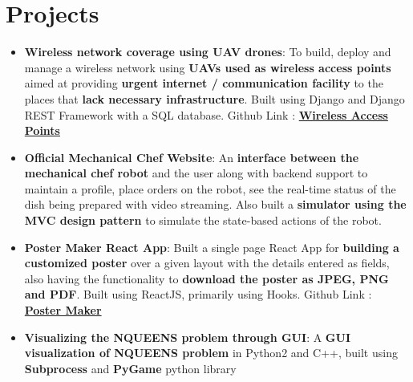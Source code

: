 \documentclass[a4paper,timesnewroman,11pt, twoside]{article}
\numberwithin{equation}{section}
\newcommand{\resumeItem}[2]{
  \item\small{
    \textbf{#1}{: #2 \vspace{-5pt}}
  }
}
\newcommand{\resumeSubItem}[2]{\resumeItem{#1}{#2}\vspace{-3pt}}
\newcommand{\resumeSubHeadingListStart}{\begin{itemize}[leftmargin=*]}
\newcommand{\resumeSubHeadingListEnd}{\end{itemize}}
\begin{document}
\section{Projects}
  \resumeSubHeadingListStart
    \resumeSubItem{Wireless network coverage using UAV drones}
    { To build, deploy and manage a wireless network using \textbf{UAVs used as wireless access points} aimed at providing \textbf{urgent internet / communication facility} to the places that \textbf{lack necessary infrastructure}. Built using Django and Django REST Framework with a SQL database. Github Link : \href{https://github.com/SaxenaKartik/MP2}{\textbf{Wireless Access Points}}
    }
    \resumeSubItem{Official Mechanical Chef Website}
      {An \textbf{interface between the mechanical chef robot} and the user along with backend support to maintain a profile, place orders on the robot, see the real-time status of the dish being prepared with video streaming. Also built a \textbf{simulator using the MVC design pattern} to simulate the state-based actions of the robot.}
    \resumeSubItem{Poster Maker React App}
      {Built a single page React App for \textbf{building a customized poster} over a given layout with the details entered as fields, also having the functionality to \textbf{download the poster as JPEG, PNG and PDF}. Built using ReactJS, primarily using Hooks. Github Link : \href{/https://github.com/SaxenaKartik/Heuristics-Poster}{\textbf{Poster Maker}}
      } 
    \resumeSubItem{Visualizing the NQUEENS problem through GUI}
      {A \textbf{GUI visualization of NQUEENS problem} in Python2 and C++, built using \textbf{Subprocess} and \textbf{PyGame} python library}
  \resumeSubHeadingListEnd
\end{document}
